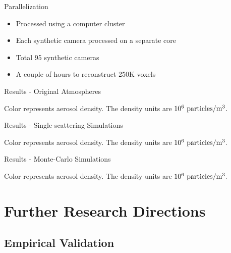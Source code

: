 \documentclass[compress,red,12pt]{beamer}
\begin{document}
\begin{frame}{Parallelization}
  \begin{itemize}
  \item Processed using a computer cluster
  \item Each synthetic camera processed on a separate core
  \item Total 95 synthetic cameras
  \item A couple of hours to reconstruct 250K voxels
  \end{itemize}
\end{frame}

\begin{frame}{Results - Original Atmospheres}
  \centerline{\def\svgwidth{1.15\linewidth}\footnotesize{}}
  \centerline{\footnotesize Color represents aerosol density. The
    density units are $10^{6}~{\rm particles}/{\rm m}^3.$}
\end{frame}

\begin{frame}{Results - Single-scattering Simulations}
  \centerline{\def\svgwidth{1.15\linewidth}\footnotesize{}}
  \centerline{\footnotesize Color represents aerosol density. The
    density units are $10^{6}~{\rm particles}/{\rm m}^3.$}
\end{frame}

\begin{frame}{Results - Monte-Carlo Simulations}
  \centerline{\def\svgwidth{1.15\linewidth}\footnotesize{}}
  \centerline{\footnotesize Color represents aerosol density. The
    density units are $10^{6}~{\rm particles}/{\rm m}^3.$}
\end{frame}


\section{Further Research Directions}

\subsection{Empirical Validation}
\end{document}
